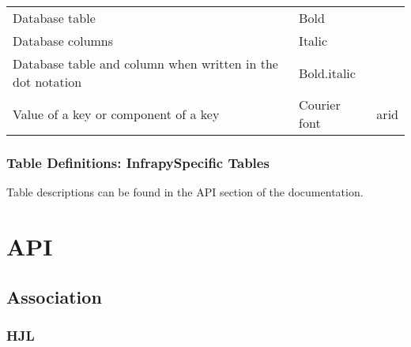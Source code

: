 \documentclass[letterpaper,10pt,english]{sphinxmanual}
\begin{document}
\begin{savenotes}\sphinxattablestart
\centering
\begin{tabulary}{\linewidth}[t]{|T|T|T|}
\hline
\sphinxstyletheadfamily 
{}
&\sphinxstyletheadfamily 
{}
&\sphinxstyletheadfamily 
{}
\\
\hline
Database table
&
Bold
&
\\
\hline
Database columns
&
Italic
&
\\
\hline
Database table and
column when written
in the dot notation
&
Bold.italic
&
\\
\hline
Value of a key or
component of a key
&
Courier font
&
arid
\\
\hline
\end{tabulary}
\par
\sphinxattableend\end{savenotes}


\subsubsection{Table Definitions: Infrapy\sphinxhyphen{}Specific Tables}
\label{\detokenize{schema:table-definitions-infrapy-specific-tables}}
Table descriptions can be found in the API section of the documentation.


\section{API}
\label{\detokenize{infrapy:api}}\label{\detokenize{infrapy:id1}}\label{\detokenize{infrapy::doc}}

\subsection{Association}
\label{\detokenize{infrapy.association:module-infrapy.association}}\label{\detokenize{infrapy.association:association}}\label{\detokenize{infrapy.association::doc}}

\subsubsection{HJL}
\label{\detokenize{infrapy.association:module-infrapy.association.hjl}}\label{\detokenize{infrapy.association:hjl}}
\end{document}
